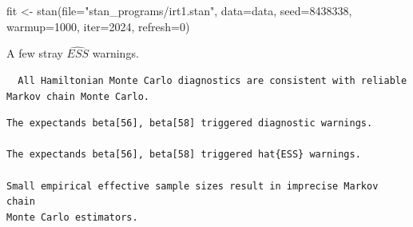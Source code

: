 \documentclass[
  letterpaper,
  DIV=11,
  numbers=noendperiod]{scrartcl}
\newenvironment{Shaded}{\begin{snugshade}}{\end{snugshade}}
\newcommand{\AttributeTok}[1]{\textcolor[rgb]{0.40,0.45,0.13}{#1}}
\newcommand{\ConstantTok}[1]{\textcolor[rgb]{0.56,0.35,0.01}{#1}}
\newcommand{\DecValTok}[1]{\textcolor[rgb]{0.68,0.00,0.00}{#1}}
\newcommand{\FunctionTok}[1]{\textcolor[rgb]{0.28,0.35,0.67}{#1}}
\newcommand{\NormalTok}[1]{\textcolor[rgb]{0.00,0.23,0.31}{#1}}
\newcommand{\OtherTok}[1]{\textcolor[rgb]{0.00,0.23,0.31}{#1}}
\newcommand{\SpecialCharTok}[1]{\textcolor[rgb]{0.37,0.37,0.37}{#1}}
\newcommand{\StringTok}[1]{\textcolor[rgb]{0.13,0.47,0.30}{#1}}
\begin{document}
\begin{Shaded}
\begin{Highlighting}[]
\NormalTok{fit }\OtherTok{\textless{}{-}} \FunctionTok{stan}\NormalTok{(}\AttributeTok{file=}\StringTok{"stan\_programs/irt1.stan"}\NormalTok{,}
            \AttributeTok{data=}\NormalTok{data, }\AttributeTok{seed=}\DecValTok{8438338}\NormalTok{,}
            \AttributeTok{warmup=}\DecValTok{1000}\NormalTok{, }\AttributeTok{iter=}\DecValTok{2024}\NormalTok{, }\AttributeTok{refresh=}\DecValTok{0}\NormalTok{)}
\end{Highlighting}
\end{Shaded}

A few stray \(\hat{ESS}\) warnings.

\begin{Shaded}
\end{Shaded}

\begin{verbatim}
  All Hamiltonian Monte Carlo diagnostics are consistent with reliable
Markov chain Monte Carlo.
\end{verbatim}

\begin{Shaded}
\end{Shaded}

\begin{verbatim}
The expectands beta[56], beta[58] triggered diagnostic warnings.

The expectands beta[56], beta[58] triggered hat{ESS} warnings.

Small empirical effective sample sizes result in imprecise Markov chain
Monte Carlo estimators.
\end{verbatim}
\end{document}

